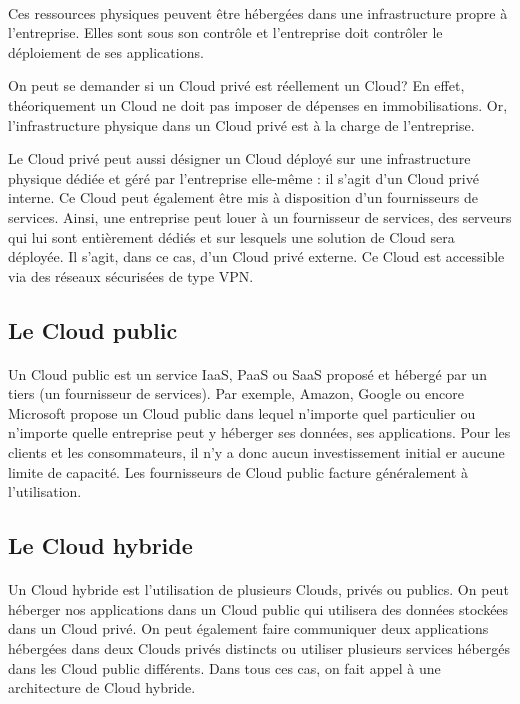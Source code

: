 \documentclass[a4paper,12pt]{report}
\begin{document}
\begin{onehalfspace}
	\paragraph*{}
	Ces ressources physiques peuvent être hébergées dans une infrastructure propre à l’entreprise. Elles sont sous son contrôle et l’entreprise doit contrôler le déploiement de ses applications.
	
	On peut se demander si un Cloud privé est réellement un Cloud? En effet, théoriquement un Cloud ne doit pas imposer de dépenses en immobilisations. Or, l’infrastructure physique dans un Cloud privé est à la charge de l’entreprise.
	
	Le Cloud privé peut aussi désigner un Cloud déployé sur une infrastructure physique dédiée et géré par l’entreprise elle-même : il s’agit d’un Cloud privé interne. Ce Cloud peut également être mis à disposition d’un fournisseurs de services. Ainsi, une entreprise peut louer à un fournisseur de services, des serveurs qui lui sont entièrement dédiés et sur lesquels une solution de Cloud sera déployée. Il s’agit, dans ce cas, d’un Cloud privé externe. Ce Cloud est accessible via des réseaux sécurisées de type VPN.
	
	\subsection{Le Cloud public}
	
	\paragraph*{}
	Un Cloud public est un service IaaS, PaaS ou SaaS proposé et hébergé par un tiers (un fournisseur de services). Par exemple, Amazon, Google ou encore Microsoft propose un Cloud public dans lequel n’importe quel particulier ou n’importe quelle entreprise peut y héberger ses données, ses applications. Pour les clients et les consommateurs, il n’y a donc aucun investissement initial er aucune limite de capacité. Les fournisseurs de Cloud public facture généralement à l’utilisation.	
	
	\subsection{Le Cloud hybride}
	
	\paragraph*{}
	Un Cloud hybride est l’utilisation de plusieurs Clouds, privés ou publics.
On peut héberger nos applications dans un Cloud public qui utilisera des données stockées dans un Cloud privé. On peut également faire communiquer deux applications hébergées dans deux Clouds privés distincts ou utiliser plusieurs services hébergés dans les Cloud public différents. Dans tous ces cas, on fait appel à une architecture de Cloud hybride.
	

\end{onehalfspace}
\end{document}
